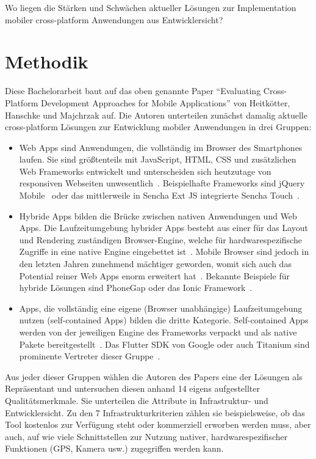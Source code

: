 Wo liegen die Stärken und Schwächen aktueller Lösungen zur Implementation mobiler cross-platform Anwendungen aus Entwicklersicht?

\section*{Methodik}

Diese Bachelorarbeit baut auf das oben genannte Paper “Evaluating Cross-Platform Development Approaches for Mobile Applications” von Heitkötter, Hanschke und Majchrzak auf. Die Autoren unterteilen zunächst damalig aktuelle cross-platform Lösungen zur Entwicklung mobiler Anwendungen in drei Gruppen:
\begin{itemize}
    \item Web Apps sind Anwendungen, die vollständig im Browser des Smartphones laufen. Sie sind größtenteils mit JavaScript, HTML, CSS und zusätzlichen Web Frameworks entwickelt und unterscheiden sich heutzutage von responsiven Webseiten unwesentlich~\cite{eva12}.
    Beispielhafte Frameworks sind jQuery Mobile~\cite{jquery} oder das mittlerweile in Sencha Ext JS integrierte Sencha Touch~\cite{sencha}.
    
    \item Hybride Apps bilden die Brücke zwischen nativen Anwendungen und Web Apps. Die Laufzeitumgebung hybrider Apps besteht aus einer für das Layout und Rendering zuständigen Browser-Engine, welche für hardwarespezifische Zugriffe in eine native Engine eingebettet ist~\cite{eva12}.
    Mobile Browser sind jedoch in den letzten Jahren zunehmend mächtiger geworden, womit sich auch das Potential reiner Web Apps enorm erweitert hat~\cite{gdev}.
    Bekannte Beispiele für hybride Lösungen sind PhoneGap oder das Ionic Framework~\cite{phonegap,ionic}.
    
    \item Apps, die vollständig eine eigene (Browser unabhängige) Laufzeitumgebung nutzen (self-contained Apps) bilden die dritte Kategorie. Self-contained Apps werden von der jeweiligen Engine des Frameworks verpackt und als native Pakete bereitgestellt~\cite{eva12}. Das Flutter SDK von Google oder auch Titanium sind prominente Vertreter dieser Gruppe~\cite{flutter,tita}.
    
\end{itemize}
Aus jeder dieser Gruppen wählen die Autoren des Papers eine der Lösungen als Repräsentant und untersuchen diesen anhand 14 eigens aufgestellter Qualitätsmerkmale. Sie unterteilen die Attribute in Infrastruktur- und Entwicklersicht. Zu den 7 Infrastrukturkriterien zählen sie beispielsweise, ob das Tool kostenlos zur Verfügung steht oder kommerziell erworben werden muss, aber auch, auf wie viele Schnittstellen zur Nutzung nativer, hardwarespezifischer Funktionen (GPS, Kamera usw.) zugegriffen werden kann.
